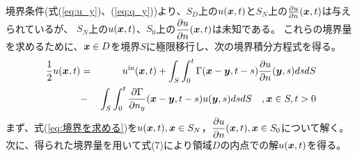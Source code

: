 \documentclass[dvipdfmx]{ampbt}
\def\vector#1{\mbox{\boldmath $#1$}}
\begin{document}
境界条件(式(\ref{eq:u_y})、(\ref{eq:q_y}))より、$S_D$上の$u(\vector{x},t)$と$S_N$上の$\frac{\partial u}{\partial n}(\vector{x},t)$は与えられているが、
$S_N$上の$u(\vector{x},t)$、$S_0$上の$\dfrac{\partial u}{\partial n}(\vector{x},t)$は未知である。
これらの境界量を求めるために、$\vector{x} \in D$を境界$S$に極限移行し、次の境界積分方程式を得る。
\begin{eqnarray}
  \label{eq:境界を求める}
\frac{1}{2} u(\vector{x},t) &=& u^{\rm{in}}(\vector{x},t) + \int_S \int_0^t \Gamma (\vector{x}-\vector{y},t-s) \frac{\partial u}{\partial n}(\vector{y},s) ds dS \nonumber \\
                                               &-& \int_S \int_0^t \frac{\partial \Gamma}{\partial n_y} (\vector{x}-\vector{y},t-s) u(\vector{y},s) ds dS \quad, \vector{x} \in S , t > 0
\end{eqnarray}
まず、式(\ref{eq:境界を求める})を$u(\vector{x},t) , \vector{x} \in S_N$，$\dfrac{\partial u}{\partial n}(\vector{x},t) , \vector{x} \in S_0$について解く。\\
次に、得られた境界量を用いて式(7)により領域$D$の内点での解$u(\vector{x},t)$を得る。
\end{document}
